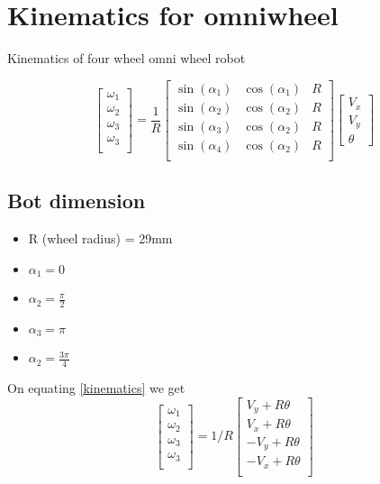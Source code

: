 \documentclass[a4paper]{article}
\begin{document}

\section{Kinematics for omniwheel }
Kinematics of four wheel omni wheel robot

\begin{equation}\label{kinematics}   
    \begin{bmatrix}
		\omega_1 \\
		\omega_2 \\
		\omega_3 \\
		\omega_3 \\
	\end{bmatrix}
	=\frac{1}{R}
	\begin{bmatrix}
		\sin(\alpha_1) & \cos(\alpha_1) & R \\
		\sin(\alpha_2) & \cos(\alpha_2) & R \\
		\sin(\alpha_3) & \cos(\alpha_2) & R \\
		\sin(\alpha_4) & \cos(\alpha_2) & R \\
	\end{bmatrix}
	\begin{bmatrix}
		V_x \\
		V_y \\
		\theta
	\end{bmatrix}
\end{equation}
\subsection{Bot dimension}
\begin{itemize}
	\item R (wheel radius) = 29mm
	\item $\alpha_1 = 0 $
	\item $\alpha_2 = \frac{\pi}{2} $
	\item $\alpha_3 = \pi $
	\item $\alpha_2 = \frac{3\pi}{4} $
\end{itemize}
On equating \ref{kinematics} we get
\begin{equation}
	\begin{bmatrix}
		\omega_1 \\
		\omega_2 \\
		\omega_3 \\
		\omega_3 \\
	\end{bmatrix}
	= 1/R \begin{bmatrix}
		V_y + R \theta  \\
		V_x + R \theta  \\
		-V_y + R \theta \\
		-V_x + R \theta \\
	\end{bmatrix}
\end{equation}
\end{document}
